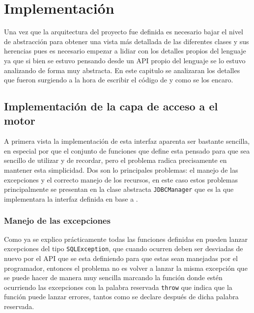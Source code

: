 \chapter{Implementación}
Una vez que la arquitectura del proyecto fue definida es necesario bajar el nivel de abstracción para obtener una vista más detallada de las diferentes clases y sus herencias pues es necesario empezar a lidiar con los detalles propios del lenguaje ya que si bien se estuvo pensando desde un API propio del lenguaje se lo estuvo analizando de forma muy abstracta. En este capitulo se analizaran los detalles que fueron surgiendo a la hora de escribir el código de \jj y como se los encaro.
%
%
%
\section{Implementación de la capa de acceso a el motor}
A primera vista la implementación de esta interfaz aparenta ser bastante sencilla, en especial por que el conjunto de funciones que define esta pensado para que sea sencillo de utilizar y de recordar, pero el problema radica precisamente en mantener esta simplicidad. Dos son lo principales problemas: el manejo de las excepciones y el correcto manejo de los recursos, en este caso estos problemas principalmente se presentan en la clase abstracta \verb=JDBCManager= que es la que implementara la interfaz definida en base a \jd.
%
\subsection{Manejo de las excepciones}
Como ya se explico prácticamente todas las funciones definidas en \jd pueden lanzar excepciones del tipo \verb=SQLException=, que cuando ocurren deben ser desviadas de nuevo por el API que se esta definiendo para que estas sean manejadas por el programador, entonces el problema   no es volver a lanzar la misma excepción que se puede hacer de manera muy sencilla marcando la función donde estén ocurriendo las excepciones con la palabra reservada \verb=throw= que indica que la función puede lanzar errores, tantos como se declare después de dicha palabra reservada.

